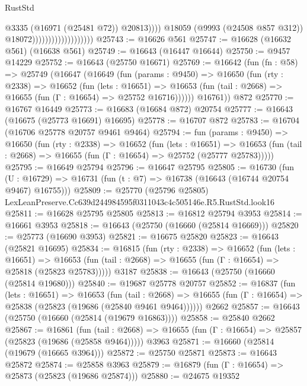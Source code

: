 \begin{lexlean}{RustStd}
\begin{coremodule}
                                                  @3335
                                                  (@16971 (@25481 @72))
                                                  @20813))))
                                          @18059
                                          (@9993 (@24508 @857 @312))
                                          @18072)))))))))))))))))))
@25743 := @16626 @561
@25747 := @16628 (@16632 @561) (@16638 @561)
@25749 := @16643 (@16447 @16644)
@25750 := @9457 @14229
@25752 := @16643 (@25750 @16671)
@25769 := @16642
    (fun (fn : @58) =>
    @25749
      (@16647
        (@16649
          (fun (params : @9450) =>
          @16650
            (fun (rty : @2338) =>
            @16652
              (fun (lets : @16651) =>
              @16653 (fun (tail : @2668) => @16655 (fun (Γ : @16654) => @25752 @16716))))))
        @16761))
    @872
@25770 := @16767 @16449
@25773 := @16683 (@16684 @872) @20754
@25777 := @16643 (@16675 (@25773 @16691) @16695)
@25778 := @16707 @872
@25783 := @16704 (@16706 @25778 @20757 @9461 @9464)
@25794 := fun (params : @9450) =>
  @16650
    (fun (rty : @2338) =>
    @16652
      (fun (lets : @16651) =>
      @16653 (fun (tail : @2668) => @16655 (fun (Γ : @16654) => @25752 (@25777 @25783)))))
@25795 := @16649 @25794
@25796 := @16647 @25795
@25805 := @16730
    (fun (U : @16729) => @16731 (fun (t : @7) => @16738 (@16643 (@16744 @20754 @9467) @16755)))
@25809 := @25770 (@25796 @25805) LexLeanPreserve.Cc639d244984595f0311043c4c505146e.R5.RustStd.look16
@25811 := @16628 @25795 @25805
@25813 := @16812 @25794 @3953
@25814 := @16661 @3953
@25818 := @16643 (@25750 (@16660 (@25814 @16669)))
@25820 := @25773 (@16690 @3953)
@25821 := @16675 @25820
@25823 := @16643 (@25821 @16695)
@25834 := @16815
    (fun (rty : @2338) =>
    @16652
      (fun (lets : @16651) =>
      @16653 (fun (tail : @2668) => @16655 (fun (Γ : @16654) => @25818 (@25823 @25783)))))
    @3187
@25838 := @16643 (@25750 (@16660 (@25814 @19680)))
@25840 := @19687 @25778 @20757
@25852 := @16837
    (fun (lets : @16651) =>
    @16653
      (fun (tail : @2668) =>
      @16655 (fun (Γ : @16654) => @25838 (@25823 (@19686 (@25840 @9461 @9464))))))
    @2662
@25857 := @16643 (@25750 (@16660 (@25814 (@19679 @16863))))
@25858 := @25840 @2662
@25867 := @16861
    (fun (tail : @2668) => @16655 (fun (Γ : @16654) => @25857 (@25823 (@19686 (@25858 @9464)))))
    @3963
@25871 := @16660 (@25814 (@19679 (@16665 @3964)))
@25872 := @25750 @25871
@25873 := @16643 @25872
@25874 := @25858 @3963
@25879 := @16879 (fun (Γ : @16654) => @25873 (@25823 (@19686 @25874)))
@25880 := @24675 @19352

\end{coremodule}
\end{lexlean}

